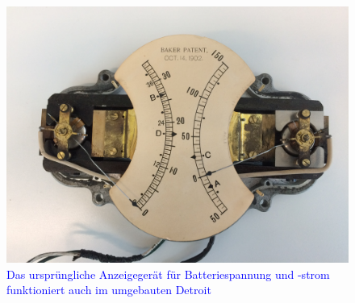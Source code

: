\begin{landscape}
\begin{figure}[h]
		\includegraphics[width=1.30\textwidth]{images/Anhang/Volt_Ampere.jpg}
	\caption{\textcolor{blue}{Das ursprüngliche Anzeigegerät für Batteriespannung und -strom funktioniert auch im umgebauten Detroit}}
	\label{fig:Volt_Ampere}
\end{figure}\end{landscape}

